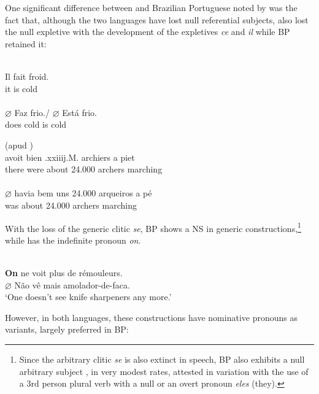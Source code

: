 \documentclass[output=paper]{langsci/langscibook}
\begin{document}
One significant difference between  and Brazilian Portuguese noted
by \citet{Duarte1995} was the fact that, although the two  languages
have lost null referential subjects,  also lost the null expletive
with the development of the expletives \emph{ce}  and \emph{il} while
\gls{BP} retained it:

\ea%
    \label{ex:key:26.11}
    \ea {}\\
    \gll    Il fait froid.\\
            it is  cold\\
    \ex {}\\
    \gll    \textbf{$\varnothing$}\tss{\Expl} Faz frio./ $\varnothing$\tss{\Expl} Está frio.\\
            {} does cold {} is cold\\
    \z
\z

\ea%
    \label{ex:key:26.12}
    \ea {} (apud \citealt[151]{Roberts1993})\\
     avoit bien .xxiiij.M.   archiers {a piet}\\
            there were about 24.000 archers marching\\
    \newpage
    \ex {}\\
    \gll    $\varnothing$\tss{\Expl} havia {bem uns} 24.000    arqueiros {a pé}\\
            {}  was about 24.000 archers marching\\
    \z
\z

With the loss of the generic clitic \emph{se}, BP shows a NS in
generic constructions,\footnote{Since the arbitrary clitic \emph{se} is also
    extinct in speech, \gls{BP} also exhibits a null arbitrary subject
    \parencite{Rodrigues2004}, in very modest rates, attested in variation
with the use of a 3rd person plural verb with a null or an overt pronoun
\emph{eles} (they).} while  has the indefinite pronoun \emph{on}.

\ea%
    \label{ex:key:26.13}
    \ea {}\\
        \textbf{On} ne voit plus de rémouleurs.
    \ex {}\\
        $\varnothing$ Não vê mais amolador-de-faca.\\
        ‘One doesn’t see knife sharpeners any more.’
    \z
\z

However, in both languages, these constructions have nominative pronouns as
variants, largely preferred in \gls{BP}:
\end{document}
